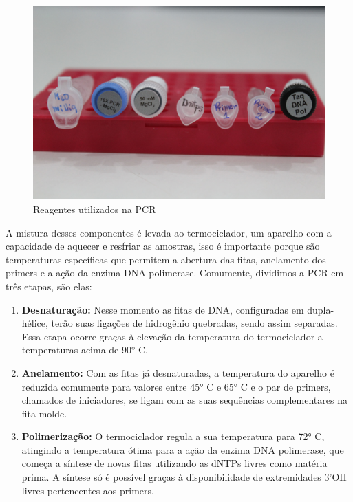 \documentclass[
  letterpaper,
  DIV=11,
  numbers=noendperiod]{scrreprt}
\begin{document}
\begin{figure}

{\centering \includegraphics{figures/amplificacao-reagentes.JPG}

}

\caption{Reagentes utilizados na PCR}

\end{figure}

A mistura desses componentes é levada ao termociclador, um aparelho com
a capacidade de aquecer e resfriar as amostras, isso é importante porque
são temperaturas específicas que permitem a abertura das fitas,
anelamento dos primers e a ação da enzima DNA-polimerase. Comumente,
dividimos a PCR em três etapas, são elas:

\begin{enumerate}
\def\labelenumi{\arabic{enumi}.}
\item
  \textbf{Desnaturação:} Nesse momento as fitas de DNA, configuradas em
  dupla-hélice, terão suas ligações de hidrogênio quebradas, sendo assim
  separadas. Essa etapa ocorre graças à elevação da temperatura do
  termociclador a temperaturas acima de 90° C.
\item
  \textbf{Anelamento:} Com as fitas já desnaturadas, a temperatura do
  aparelho é reduzida comumente para valores entre 45° C e 65° C e o par
  de primers, chamados de iniciadores, se ligam com as suas sequências
  complementares na fita molde.
\item
  \textbf{Polimerização:} O termociclador regula a sua temperatura para
  72° C, atingindo a temperatura ótima para a ação da enzima DNA
  polimerase, que começa a síntese de novas fitas utilizando as dNTPs
  livres como matéria prima. A síntese só é possível graças à
  disponibilidade de extremidades 3'OH livres pertencentes aos primers.
\end{enumerate}
\end{document}
